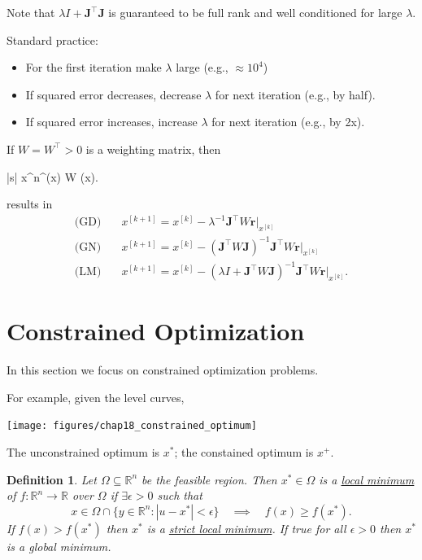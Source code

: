 \documentclass{article}
\newtheorem{definition}[theorem]{Definition}
\newcommand{\rbf}{\mathbf{r}}
\newcommand{\Jbf}{\mathbf{J}}
\begin{document}
	Note that $\lambda I + \Jbf^\top \Jbf$ is guaranteed to be full rank and well conditioned for large $\lambda$.
	
	Standard practice:
	\begin{itemize}
		\item For the first iteration make $\lambda$ large (e.g., $\approx 10^4$)
		\item If squared error decreases, decrease $\lambda$ for next iteration (e.g., by half).
		\item If squared error increases, increase $\lambda$ for next iteration (e.g., by 2x).
	\end{itemize}

	If $W=W^\top >0$ is a weighting matrix, then 
	\begin{mini*}|s|
		{x\in{}^n}{\rbf^\top(x) W \rbf(x)}{}{}.
	\end{mini*}
	results in
	\begin{align*}
		\text{(GD)} &\quad 	x^{[k+1]} = x^{[k]} - \lambda^{-1} \Jbf^\top W \rbf\big|_{x^{[k]}} \\
		\text{(GN)} &\quad 	x^{[k+1]} = x^{[k]} - \left(\Jbf^\top W \Jbf\right)^{-1} \Jbf^\top W \rbf\big|_{x^{[k]}} \\
		\text{(LM)} &\quad 	x^{[k+1]} = x^{[k]} - \left(\lambda I + \Jbf^\top W \Jbf\right)^{-1} \Jbf^\top W \rbf\big|_{x^{[k]}}.		
	\end{align*}


\section{Constrained Optimization}

	In this section we focus on constrained optimization problems.
	
	
	For example, given the level curves,
	\begin{center}
		\texttt{[image: figures/chap18\_constrained\_optimum]}
	\end{center}
	The unconstrained optimum is $x^{\ast}$; the constained optimum is $x^{+}$.

	\begin{definition}
		Let $\Omega \subseteq \mathbb{R}^n$ be the feasible region.  
		Then $x^{\ast}\in \Omega$ is a \underline{local minimum} of $f:\mathbb{R}^n\to\mathbb{R}$ over $\Omega$ if $\exists \epsilon > 0$ such that 
		\[
			x \in \Omega \cap \{y\in \mathbb{R}^n:|u-x^{\ast}|<\epsilon\} \quad \implies \quad f(x) \geq f(x^{\ast}).
		\]
		If $f(x) > f(x^{\ast})$ then $x^{\ast}$ is a \underline{strict local minimum}.  
		If true for all $\epsilon > 0$ then $x^{\ast}$ is a global minimum.
	\end{definition}
	
\end{document}
